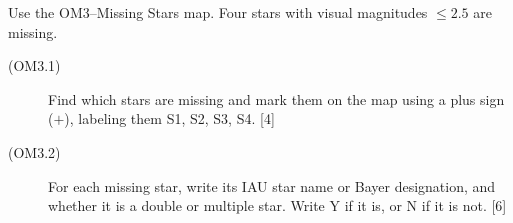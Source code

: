 Use the OM3--Missing Stars map. Four stars with visual magnitudes $\leq2.5$ are missing.
\begin{description}
\item[(OM3.1)] Find which stars are missing and mark them on the map using a plus sign ($+$), labeling them S1, S2, S3, S4. \hfill[4]
\item[(OM3.2)] For each missing star, write its IAU star name or Bayer designation, and whether it is a double or multiple star. Write Y if it is, or N if it is not. \hfill[6]
\end{description}

